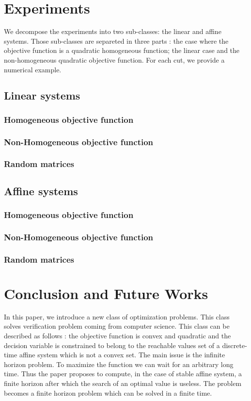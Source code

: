 \documentclass[10pt]{article}
\begin{document}
\section{Experiments}
We decompose the experiments into two sub-classes: the linear and affine systems. Those sub-classes are separeted in three parts : the  case where the objective function is a quadratic homogeneous function; the linear case and the non-homogeneous quadratic objective function. For each cut, we provide a numerical example.  
\subsection{Linear systems}

\subsubsection{Homogeneous objective function}

\subsubsection{Non-Homogeneous objective function}

\subsubsection{Random matrices}

\subsection{Affine systems}

\subsubsection{Homogeneous objective function}

\subsubsection{Non-Homogeneous objective function}

\subsubsection{Random matrices}
\section{Conclusion and Future Works} 
In this paper, we introduce a new class of optimization problems. This class solves verification problem coming from computer science. This class can be described as follows : the objective function is convex and quadratic and the decision variable is constrained to belong to the reachable values set of a discrete-time affine system which is not a convex set. The main issue is the infinite horizon problem. To maximize the function we can wait for an arbitrary long time. Thus the paper proposes to compute, in the case of stable affine system, a finite horizon after which the search of an optimal value is useless. The problem becomes a finite horizon problem which can be solved in a finite time. 
\end{document}
